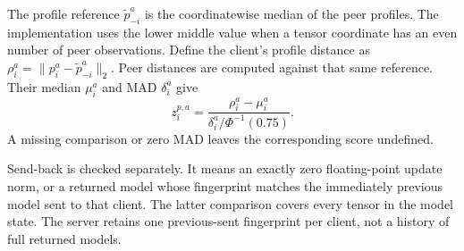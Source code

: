 \documentclass[conference]{IEEEtran}
\begin{document}
The profile reference $\widetilde p_{-i}^a$ is the coordinatewise median
of the peer profiles. The implementation uses the lower middle value
when a tensor coordinate has an even number of peer observations.
Define the client's profile distance as
$\rho_i^a=\|p_i^a-\widetilde p_{-i}^a\|_2$. Peer distances are computed
against that same reference. Their median $\mu_i^a$ and MAD $\delta_i^a$
give
\begin{equation}\label{eq:profile-score}
 z_i^{p,a}=\frac{\rho_i^a-\mu_i^a}
                  {\delta_i^a/\Phi^{-1}(0.75)}.
\end{equation}
A missing comparison or zero MAD leaves the corresponding score undefined.

Send-back is checked separately. It means an exactly zero floating-point
update norm, or a returned model whose fingerprint matches the immediately
previous model sent to that client. The latter comparison covers every
tensor in the model state. The server retains one previous-sent fingerprint
per client, not a history of full returned models.
\end{document}
